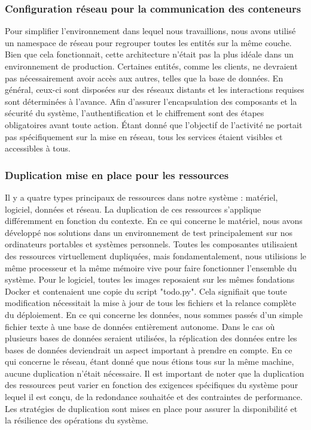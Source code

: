 \documentclass[a11paper, 11pt]{article}
\begin{document}
\subsubsection{Configuration réseau pour la communication des conteneurs}

Pour simplifier l'environnement dans lequel nous travaillions, nous avons utilisé un namespace de réseau pour regrouper toutes les entités sur la même couche. Bien que cela fonctionnait, cette architecture n'était pas la plus idéale dans un environnement de production. Certaines entités, comme les clients, ne devraient pas nécessairement avoir accès aux autres, telles que la base de données. En général, ceux-ci sont disposées sur des réseaux distants et les interactions requises sont déterminées à l'avance. Afin d'assurer l'encapsulation des composants et la sécurité du système, l'authentification et le chiffrement sont des étapes obligatoires avant toute action. Étant donné que l'objectif de l'activité ne portait pas spécifiquement sur la mise en réseau, tous les services étaient visibles et accessibles à tous.

\subsubsection{Duplication mise en place pour les ressources}
Il y a quatre types principaux de ressources dans notre système : matériel, logiciel, données et réseau. La duplication de ces ressources s'applique différemment en fonction du contexte.
En ce qui concerne le matériel, nous avons développé nos solutions dans un environnement de test principalement sur nos ordinateurs portables et systèmes personnels. Toutes les composantes utilisaient des ressources virtuellement dupliquées, mais fondamentalement, nous utilisions le même processeur et la même mémoire vive pour faire fonctionner l'ensemble du système.
Pour le logiciel, toutes les images reposaient sur les mêmes fondations Docker et contenaient une copie du script "todo.py". Cela signifiait que toute modification nécessitait la mise à jour de tous les fichiers et la relance complète du déploiement.
En ce qui concerne les données, nous sommes passés d'un simple fichier texte à une base de données entièrement autonome. Dans le cas où plusieurs bases de données seraient utilisées, la réplication des données entre les bases de données deviendrait un aspect important à prendre en compte.
En ce qui concerne le réseau, étant donné que nous étions tous sur la même machine, aucune duplication n'était nécessaire.
Il est important de noter que la duplication des ressources peut varier en fonction des exigences spécifiques du système pour lequel il est conçu, de la redondance souhaitée et des contraintes de performance. Les stratégies de duplication sont mises en place pour assurer la disponibilité et la résilience des opérations du système.
\end{document}
